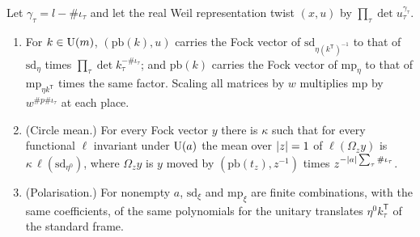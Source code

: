 \begin{lemma}\label{lem:two-polynomials}
Let $\gamma_\tau=l-\#\iota_\tau$ and let the real Weil representation twist $(x,u)$ by $\prod_\tau\det u_\tau^{\gamma_\tau}$.
\begin{enumerate}[label=\textup{(\alph*)}]
\item For $k\in\operatorname{U}(m)$, $(\mathrm{pb}(k),u)$ carries the Fock vector of $\mathrm{sd}_{\eta(k^{\mathsf T})^{-1}}$ to that of $\mathrm{sd}_\eta$ times $\prod_\tau\det k_\tau^{-\#\iota_\tau}$; and $\mathrm{pb}(k)$ carries the
Fock vector of $\mathrm{mp}_\eta$ to that of $\mathrm{mp}_{\eta k^{\mathsf T}}$ times the same factor. Scaling all matrices by $w$ multiplies $\mathrm{mp}$ by $w^{\#p\#\iota_\tau}$ at each place.
\item (Circle mean.) For every Fock vector $y$ there is $\kappa$ such that for every functional $\ell$ invariant under $\operatorname{U}(a)$ the mean over $\lvert z\rvert=1$ of $\ell(\Omega_z y)$ is $\kappa\,\ell(\mathrm{sd}_{\eta^0})$, where
$\Omega_zy$ is $y$ moved by $(\mathrm{pb}(t_z),z^{-1})$ times $z^{-\lvert a\rvert\sum_\tau\#\iota_\tau}$.
\item (Polarisation.) For nonempty $a$, $\mathrm{sd}_\xi$ and $\mathrm{mp}_\xi$ are finite combinations, with the same coefficients, of the same polynomials for the unitary translates $\eta^0k_\tau^{\mathsf T}$ of
the standard frame.
\end{enumerate}
\end{lemma}

